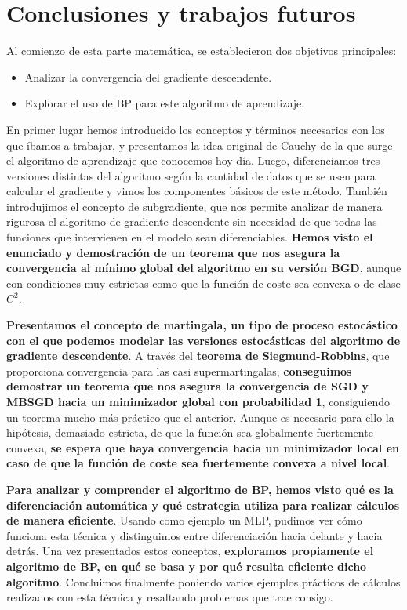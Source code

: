 \section{Conclusiones y trabajos futuros}

Al comienzo de esta parte matemática, se establecieron dos objetivos principales:

\begin{itemize}
	\item Analizar la convergencia del gradiente descendente.
	
	\item Explorar el uso de BP para este algoritmo de aprendizaje.
\end{itemize}

En primer lugar hemos introducido los conceptos y términos necesarios con los que íbamos a trabajar, y presentamos la idea original de Cauchy de la que surge el algoritmo de aprendizaje que conocemos hoy día. Luego, diferenciamos tres versiones distintas del algoritmo según la cantidad de datos que se usen para calcular el gradiente y vimos los componentes básicos de este método. También introdujimos el concepto de subgradiente, que nos permite analizar de manera rigurosa el algoritmo de gradiente descendente sin necesidad de que todas las funciones que intervienen en el modelo sean diferenciables. \textbf{Hemos visto el enunciado y demostración de un teorema que nos asegura la convergencia al mínimo global del algoritmo en su versión BGD}, aunque con condiciones muy estrictas como que la función de coste sea convexa o de clase $C^2$.

\textbf{Presentamos el concepto de martingala, un tipo de proceso estocástico con el que podemos modelar las versiones estocásticas del algoritmo de gradiente descendente}. A través del \textbf{teorema de Siegmund-Robbins}, que proporciona convergencia para las casi supermartingalas, \textbf{conseguimos demostrar un teorema que nos asegura la convergencia de SGD y MBSGD hacia un minimizador global con probabilidad 1}, consiguiendo un teorema mucho más práctico que el anterior. Aunque es necesario para ello la hipótesis, demasiado estricta, de que la función sea globalmente fuertemente convexa, \textbf{se espera que haya convergencia hacia un minimizador local en caso de que la función de coste sea fuertemente convexa a nivel local}.

\textbf{Para analizar y comprender el algoritmo de BP, hemos visto qué es la diferenciación automática y qué estrategia utiliza para realizar cálculos de manera eficiente}. Usando como ejemplo un MLP, pudimos ver cómo funciona esta técnica y distinguimos entre diferenciación hacia delante y hacia detrás. Una vez presentados estos conceptos, \textbf{exploramos propiamente el algoritmo de BP, en qué se basa y por qué resulta eficiente dicho algoritmo}. Concluimos finalmente poniendo varios ejemplos prácticos de cálculos realizados con esta técnica y resaltando problemas que trae consigo.

